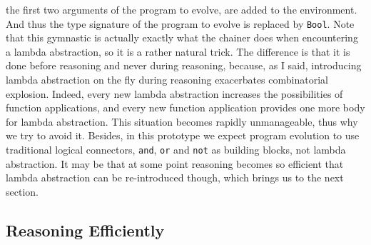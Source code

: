 \documentclass[]{report}
\begin{document}
\begin{enumerate}
the first two arguments of the program to evolve, are added to the
environment.  And thus the type signature of the program to evolve is
replaced by \texttt{Bool}.  Note that this gymnastic is
actually exactly what the chainer does when encountering a lambda
abstraction, so it is a rather natural trick.  The difference is that
it is done before reasoning and never during reasoning, because, as I
said, introducing lambda abstraction on the fly during reasoning
exacerbates combinatorial explosion.  Indeed, every new lambda
abstraction increases the possibilities of function applications, and
every new function application provides one more body for lambda
abstraction.  This situation becomes rapidly unmanageable, thus why we
try to avoid it.  Besides, in this prototype we expect program
evolution to use traditional logical connectors,
\texttt{and}, \texttt{or} and
\texttt{not} as building blocks, not lambda abstraction.
It may be that at some point reasoning becomes so efficient that
lambda abstraction can be re-introduced though, which brings us to the
next section.
\end{enumerate}

\subsection{Reasoning Efficiently}
\end{document}
